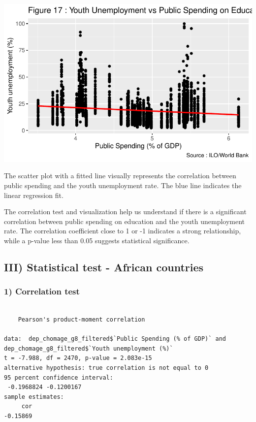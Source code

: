 \documentclass[
  letterpaper,
  DIV=11,
  numbers=noendperiod]{scrartcl}
\begin{document}
\includegraphics{Projet-BM_files/figure-pdf/unnamed-chunk-40-1.pdf}

The scatter plot with a fitted line visually represents the correlation
between public spending and the youth unemployment rate. The blue line
indicates the linear regression fit.

The correlation test and visualization help us understand if there is a
significant correlation between public spending on education and the
youth unemployment rate. The correlation coefficient close to 1 or -1
indicates a strong relationship, while a p-value less than 0.05 suggests
statistical significance.

\hypertarget{iii-statistical-test---african-countries}{%
\subsection{III) Statistical test - African
countries}\label{iii-statistical-test---african-countries}}

\hypertarget{correlation-test-1}{%
\subsubsection{1) Correlation test}\label{correlation-test-1}}

\begin{verbatim}

    Pearson's product-moment correlation

data:  dep_chomage_g8_filtered$`Public Spending (% of GDP)` and dep_chomage_g8_filtered$`Youth unemployment (%)`
t = -7.988, df = 2470, p-value = 2.083e-15
alternative hypothesis: true correlation is not equal to 0
95 percent confidence interval:
 -0.1968824 -0.1200167
sample estimates:
     cor 
-0.15869 
\end{verbatim}
\end{document}
